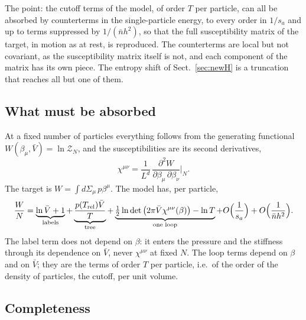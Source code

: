 \documentclass[11pt,aps,preprint,nofootinbib,superscriptaddress,tightenlines]{revtex4-2}
\def\st{\begin{equation}}
\def\stp{\end{equation}}
\def\Sect#1{Sect.~\ref{#1}}
\begin{document}
The point: the cutoff terms of the model, of order $T$ per particle, can all be absorbed by counterterms in the single-particle energy, to every order in $1/s_a$
and up to terms suppressed by $1/(\bar nh^2)$, so that the full susceptibility matrix of the target, in motion as at rest, is reproduced.  The counterterms are
local but not covariant, as the susceptibility matrix itself is not, and each component of the matrix has its own piece.  The entropy shift of \Sect{sec:newH} is a
truncation that reaches all but one of them.

\subsection{What must be absorbed}

At a fixed number of particles everything follows from the generating functional $W(\beta_\mu,\bar V)=\ln\mathcal Z_N$, and the susceptibilities are its second
derivatives,
\st
\chi^{\mu\nu}=\frac1{L^d}\,\frac{\partial^2W}{\partial\beta_\mu\,\partial\beta_\nu}\Big|_N .
\stp
The target is $W=\int d\Sigma_\mu\,p\beta^\mu$.  The model has, per particle,
\st
\frac WN=\underbrace{\ln\bar V+1}_{\text{labels}}+\underbrace{\frac{p(T_{\rm rel})\bar V}T}_{\text{tree}}
+\underbrace{\tfrac12\ln\det\big(2\pi\bar V\chi^{\mu\nu}(\beta)\big)-\ln T}_{\text{one loop}}+O\Big(\frac1{s_a}\Big)+O\Big(\frac1{\bar nh^2}\Big) .
\stp
The label term does not depend on $\beta$: it enters the pressure and the stiffness through its dependence on $\bar V$, never $\chi^{\mu\nu}$ at fixed $N$.  The loop terms
depend on $\beta$ and on $\bar V$; they are the terms of order $T$ per particle, i.e.\ of the order of the density of particles, the cutoff, per unit volume.

\subsection{Completeness}
\end{document}
